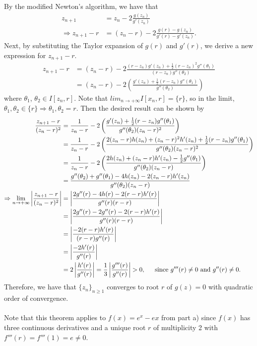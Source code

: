 \documentclass[11pt, letterpaper]{article}
\begin{document}
By the modified Newton's algorithm, we have that
\begin{align*}
    z_{n+1}&=z_n-2\frac{g(z_n)}{g'(z_n)}\\
    \Rightarrow z_{n+1}-r&=(z_n-r)-2\frac{g(r)-g(z_n)}{g'(r)-g'(z_n)}.
\end{align*}
Next, by substituting the Taylor expansion of $g(r)$ and $g'(r)$, we derive a new expression for $z_{n+1}-r$.
\begin{align*}
    z_{n+1}-r&=(z_n-r)-2\frac{(r-z_n)g'(z_n)+\frac{1}{2}(r-z_n)^2g''(\theta_1)}{(r-z_n)g''(\theta_2)}\\
    &=(z_n-r)-2\left(\frac{g'(z_n)+\frac{1}{2}(r-z_n)g''(\theta_1)}{g''(\theta_2)}\right)
\end{align*}
where $\theta_1$, $\theta_2\in I[z_n,r]$. Note that $lim_{n\to+\infty}I[x_n,r]=\{r\}$, so in the limit, $\theta_1,\theta_2\in\{r\}\Rightarrow\theta_1,\theta_2=r.$
Then the desired result can be shown by
\begin{align*}
    \frac{z_{n+1}-r}{(z_n-r)^2}&=\frac{1}{z_n-r}-2\left(\frac{g'(z_n)+\frac{1}{2}(r-z_n)g''(\theta_1)}{g''(\theta_2)(z_n-r)^2}\right)\\
    &=\frac{1}{z_n-r}-2\left(\frac{2(z_n-r)h(z_n)+(z_n-r)^2h'(z_n)+\frac{1}{2}(r-z_n)g''(\theta_1)}{g''(\theta_2)(z_n-r)^2}\right)\\
    &=\frac{1}{z_n-r}-2\left(\frac{2h(z_n)+(z_n-r)h'(z_n)-\frac{1}{2}g''(\theta_1)}{g''(\theta_2)(z_n-r)}\right)\\
    &=\frac{g''(\theta_2)+g''(\theta_1)-4h(z_n)-2(z_n-r)h'(z_n)}{g''(\theta_2)(z_n-r)}\\
    \Rightarrow \lim_{n\to+\infty}\left|\frac{z_{n+1}-r}{(z_n-r)^2}\right|&=\left|\frac{2g''(r)-4h(r)-2(r-r)h'(r)}{g''(r)(r-r)}\right|\\
    &=\left|\frac{2g''(r)-2g''(r)-2(r-r)h'(r)}{g''(r)(r-r)}\right|\\
    &=\left|\frac{-2(r-r)h'(r)}{(r-r)g''(r)}\right|\\
    &=\left|\frac{-2h'(r)}{g''(r)}\right|\\
    &=2\left|\frac{h'(r)}{g''(r)}\right|=\frac{1}{3}\left|\frac{g'''(r)}{g''(r)}\right|>0,\text{\indent since $g'''(r)\neq 0$ and $g''(r)\neq 0$.}
\end{align*}
Therefore, we have that $\{z_n\}_{n\geq 1}$ converges to root $r$ of $g(z)=0$ with quadratic order of convergence.\\\\
Note that this theorem applies to $f(x)=e^x-ex$ from part a) since $f(x)$ has three continuous derivatives and a unique root $r$ of multiplicity 2 with $f'''(r)=f'''(1)=e\neq0$.
\end{document}

